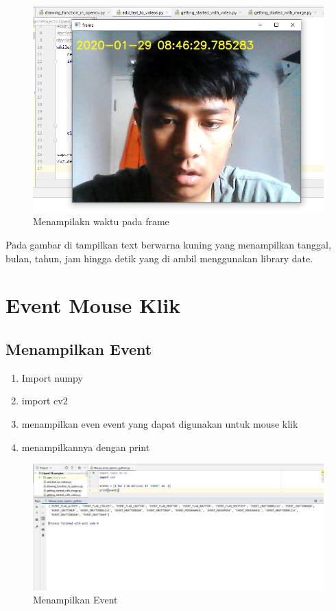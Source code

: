 \begin{figure}[ht]
\centering
\includegraphics[scale=0.6]{figures/2,18.jpg}
\caption{Menampilakn waktu pada frame}
\label{contoh}
\end{figure}
Pada gambar di tampilkan text berwarna kuning yang menampilkan tanggal, bulan, tahun, jam hingga detik yang di ambil menggunakan library date.



\newpage
\section{Event Mouse Klik}
\subsection{Menampilkan Event}

\begin{enumerate}
	\item Import numpy
	\item import cv2
	\item menampilkan even event yang dapat digunakan untuk mouse klik
	\item menampilkannya dengan print
\end{enumerate}

\begin{figure}[ht]
\centering
\includegraphics[scale=0.35]{figures/2,19.jpg}
\caption{Menampilkan Event}
\label{contoh}
\end{figure}




